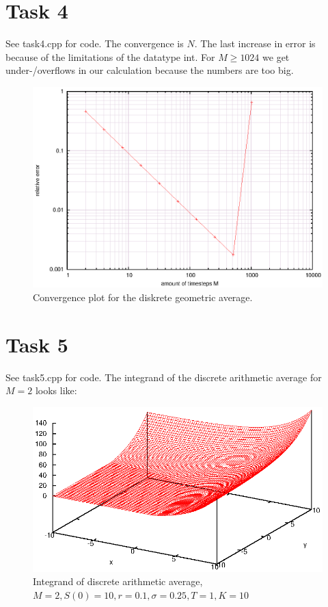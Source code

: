 \documentclass[]{article}
\begin{document}
\section*{Task 4} See task4.cpp for code. The convergence
is $N$. The last increase in error is because of the limitations of
the datatype int. For $M\ge 1024$ we get under-/overflows in our calculation
because the numbers are too big.
\begin{figure}[!ht]
\includegraphics[width=.9\textwidth]{task4.eps}
\caption{Convergence plot for the diskrete geometric average.}
\label{fig:Task4}
\end{figure}
\clearpage

\section*{Task 5} See task5.cpp for code. The
integrand of the discrete arithmetic average for $M=2$ looks like:\\
\begin{figure}[!ht]
\includegraphics[width=.9\textwidth]{task5_1}
\caption{Integrand of discrete arithmetic average, $M=2,S(0)=10,r=0.1,\sigma=0.25,T=1,K=10$}
\label{fig:Task5}
\end{figure}
\clearpage
\end{document}
